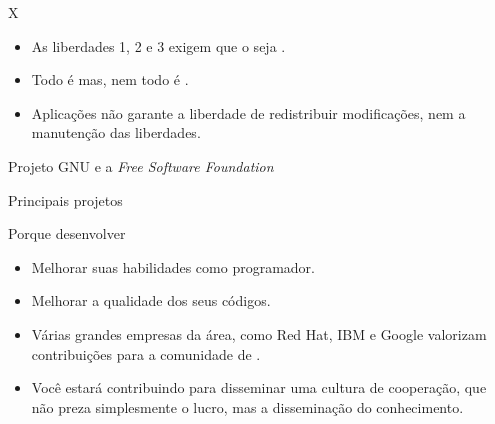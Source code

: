 \documentclass{beamer}
\begin{document}
\begin{frame}{\softwarelivre X \opensource}
   \begin{itemize}
     \item As liberdades 1, 2 e 3 exigem que o \softwarelivre seja \opensource.
        \item Todo \softwarelivre é \opensource mas, nem todo \opensource é
          \softwarelivre.
        \item Aplicações \opensource não garante a liberdade de redistribuir
          modificações, nem a manutenção das liberdades.
   \end{itemize}
\end{frame}

\begin{frame}{Projeto GNU e a \emph{Free Software Foundation}}
\end{frame}

\begin{frame}{Principais projetos}
\end{frame}


\begin{frame}{Porque desenvolver \softwarelivre}
  \begin{itemize}
    \item Melhorar suas habilidades como programador.
    \item Melhorar a qualidade dos seus códigos.
    \item Várias grandes empresas da área, como Red Hat, IBM e Google valorizam
      contribuições para a comunidade de \softwarelivre.
    \item Você estará contribuindo para disseminar uma cultura de cooperação, que não
      preza simplesmente o lucro, mas a disseminação do conhecimento.
  \end{itemize}
\end{frame}

\begin{frame}
  \begin{center}
    \begin{shell}
    \end{shell}
  \end{center}
\end{frame}
\end{document}
